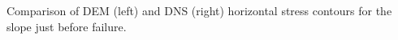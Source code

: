 \label{fig:S11DNS} Comparison of DEM (left) and DNS (right) horizontal stress contours for the slope just before failure.  
